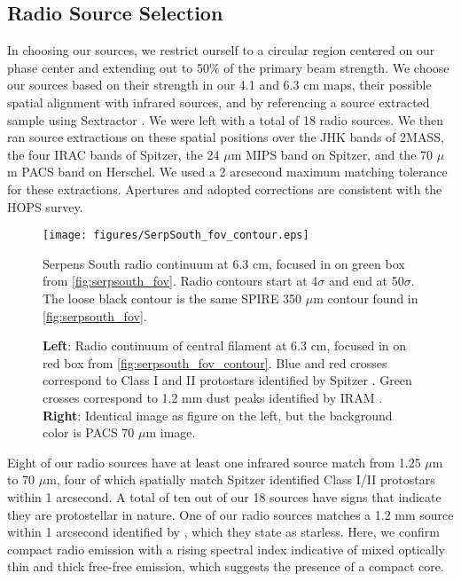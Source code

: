 \documentclass[apj]{emulateapj}
\begin{document}
\subsection{Radio Source Selection}
\label{sec:radio source selection}

In choosing our sources, we restrict ourself to a circular region centered on our phase center and extending out to 50\% of the primary beam strength. We choose our sources based on their strength in our 4.1 and 6.3 cm maps, their possible spatial alignment with infrared sources, and by referencing a source extracted sample using Sextractor \citep{Bertin96}. We were left with a total of 18 radio sources. We then ran source extractions on these spatial positions over the JHK bands of 2MASS, the four IRAC bands of Spitzer, the 24 $\mu$m MIPS band on Spitzer, and the 70 $\mu$m PACS band on Herschel. We used a 2 arcsecond maximum matching tolerance for these extractions. Apertures and adopted corrections are consistent with the HOPS survey.

\begin{figure}[h!]
\label{fig:serpsouth_fov_contour}
\centering
\texttt{[image: figures/SerpSouth\_fov\_contour.eps]}
\caption{\small{Serpens South radio continuum at 6.3 cm, focused in on green box from \autoref{fig:serpsouth_fov}. Radio contours start at 4$\sigma$ and end at 50$\sigma$. The loose black contour is the same SPIRE 350 $\mu$m contour found in \autoref{fig:serpsouth_fov}. 
}}
\end{figure}

\begin{figure*}
\caption{{\bfseries Left}: Radio continuum of central filament at 6.3 cm, focused in on red box from \autoref{fig:serpsouth_fov_contour}. Blue and red crosses correspond to Class I and II protostars identified by Spitzer \citep{Gutermuth08}. Green crosses correspond to 1.2 mm dust peaks identified by IRAM \citep{Maury11}. {\bfseries Right}: Identical image as figure on the left, but the background color is PACS 70 $\mu$m image.}
\end{figure*}


Eight of our radio sources have at least one infrared source match from 1.25 $\mu$m to 70 $\mu$m, four of which spatially match Spitzer identified Class I/II protostars within 1 arcsecond. A total of ten out of our 18 sources have signs that indicate they are protostellar in nature. One of our radio sources matches a 1.2 mm source within 1 arcsecond identified by \citep{Maury11}, which they state as starless. Here, we confirm compact radio emission with a rising spectral index indicative of mixed optically thin and thick free-free emission, which suggests the presence of a compact core.
\end{document}
